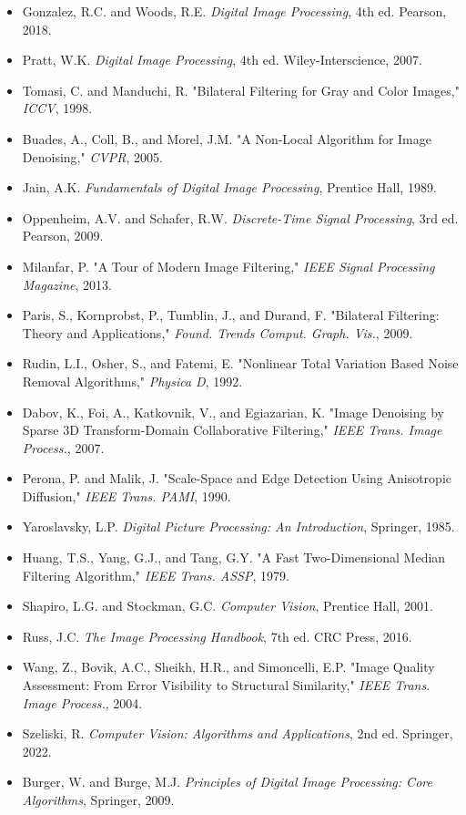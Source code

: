 \documentclass[a4paper, 11pt]{article}
\begin{document}
\begin{itemize}
\item Gonzalez, R.C. and Woods, R.E. \textit{Digital Image Processing}, 4th ed. Pearson, 2018.
\item Pratt, W.K. \textit{Digital Image Processing}, 4th ed. Wiley-Interscience, 2007.
\item Tomasi, C. and Manduchi, R. "Bilateral Filtering for Gray and Color Images," \textit{ICCV}, 1998.
\item Buades, A., Coll, B., and Morel, J.M. "A Non-Local Algorithm for Image Denoising," \textit{CVPR}, 2005.
\item Jain, A.K. \textit{Fundamentals of Digital Image Processing}, Prentice Hall, 1989.
\item Oppenheim, A.V. and Schafer, R.W. \textit{Discrete-Time Signal Processing}, 3rd ed. Pearson, 2009.
\item Milanfar, P. "A Tour of Modern Image Filtering," \textit{IEEE Signal Processing Magazine}, 2013.
\item Paris, S., Kornprobst, P., Tumblin, J., and Durand, F. "Bilateral Filtering: Theory and Applications," \textit{Found. Trends Comput. Graph. Vis.}, 2009.
\item Rudin, L.I., Osher, S., and Fatemi, E. "Nonlinear Total Variation Based Noise Removal Algorithms," \textit{Physica D}, 1992.
\item Dabov, K., Foi, A., Katkovnik, V., and Egiazarian, K. "Image Denoising by Sparse 3D Transform-Domain Collaborative Filtering," \textit{IEEE Trans. Image Process.}, 2007.
\item Perona, P. and Malik, J. "Scale-Space and Edge Detection Using Anisotropic Diffusion," \textit{IEEE Trans. PAMI}, 1990.
\item Yaroslavsky, L.P. \textit{Digital Picture Processing: An Introduction}, Springer, 1985.
\item Huang, T.S., Yang, G.J., and Tang, G.Y. "A Fast Two-Dimensional Median Filtering Algorithm," \textit{IEEE Trans. ASSP}, 1979.
\item Shapiro, L.G. and Stockman, G.C. \textit{Computer Vision}, Prentice Hall, 2001.
\item Russ, J.C. \textit{The Image Processing Handbook}, 7th ed. CRC Press, 2016.
\item Wang, Z., Bovik, A.C., Sheikh, H.R., and Simoncelli, E.P. "Image Quality Assessment: From Error Visibility to Structural Similarity," \textit{IEEE Trans. Image Process.}, 2004.
\item Szeliski, R. \textit{Computer Vision: Algorithms and Applications}, 2nd ed. Springer, 2022.
\item Burger, W. and Burge, M.J. \textit{Principles of Digital Image Processing: Core Algorithms}, Springer, 2009.
\end{itemize}
\end{document}
